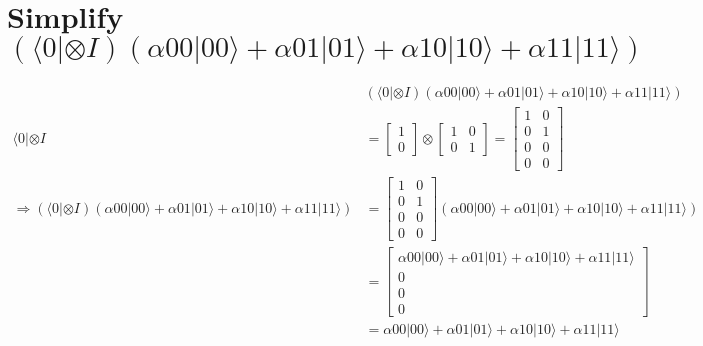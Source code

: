 \documentclass{article}
\begin{document}
\section{Simplify $(\langle0| \otimes I)(
    \alpha00|00\rangle + \alpha01|01\rangle
    + \alpha10|10\rangle + \alpha11|11\rangle
)$}
\begin{equation}
\begin{split}
    & (\langle0| \otimes I)(\alpha00|00\rangle + \alpha01|01\rangle + \alpha10|10\rangle + \alpha11|11\rangle) \\
    \langle0| \otimes I & = \begin{bmatrix}
        1 \\ 0
    \end{bmatrix} \otimes \begin{bmatrix}
        1 & 0 \\
        0 & 1
    \end{bmatrix} = \begin{bmatrix}
        1 & 0 \\
        0 & 1 \\
        0 & 0 \\
        0 & 0
    \end{bmatrix} \\
    \Longrightarrow (\langle0| \otimes I)(\alpha00|00\rangle + \alpha01|01\rangle + \alpha10|10\rangle + \alpha11|11\rangle) & =
        \begin{bmatrix}
            1 & 0 \\
            0 & 1 \\
            0 & 0 \\
            0 & 0
        \end{bmatrix} (\alpha00|00\rangle + \alpha01|01\rangle + \alpha10|10\rangle + \alpha11|11\rangle) \\
    & = \begin{bmatrix}
        \alpha00|00\rangle + \alpha01|01\rangle + \alpha10|10\rangle + \alpha11|11\rangle \\
        0 \\
        0 \\
        0
    \end{bmatrix} \\
    & = \alpha00|00\rangle + \alpha01|01\rangle + \alpha10|10\rangle + \alpha11|11\rangle
\end{split}
\end{equation}
\end{document}
